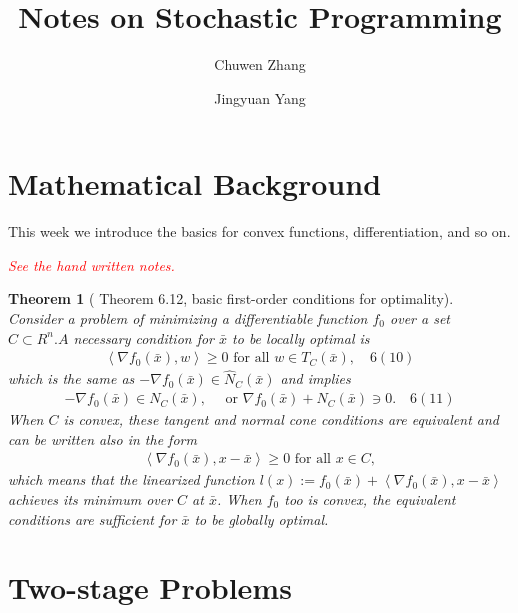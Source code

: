 \documentclass{beamerswitch}
\title{Notes on Stochastic Programming}
\newtheorem{thm}{Theorem}[section]
\begin{document}
\author[1]{\small Chuwen Zhang}
\author[1]{\small Jingyuan Yang}

\maketitle
\section{Mathematical Background}

This week we introduce the basics for convex functions, differentiation, and so on.

\emph{\textcolor{red}{See the hand written notes.}}

\begin{thm}[\cite{rockafellar_variational_2009} Theorem 6.12, basic first-order conditions for optimality] Consider a problem of minimizing a differentiable function \(f_{0}\) over a set \(C \subset R ^{n} . A\) necessary condition for \(\bar{x}\) to be locally optimal is
    \begin{align*}
        \left\langle\nabla f_{0}(\bar{x}), w\right\rangle \geq 0 \text { for all } w \in T_{C}(\bar{x}), \quad 6(10)
    \end{align*}
    which is the same as \(-\nabla f_{0}(\bar{x}) \in \widehat{N}_{C}(\bar{x})\) and implies
    \begin{align*}
        -\nabla f_{0}(\bar{x}) \in N_{C}(\bar{x}), \quad \text { or } \nabla f_{0}(\bar{x})+N_{C}(\bar{x}) \ni 0 . \quad 6(11)
    \end{align*}
    When \(C\) is convex, these tangent and normal cone conditions are equivalent and can be written also in the form
    \begin{align*}
        \left\langle\nabla f_{0}(\bar{x}), x-\bar{x}\right\rangle \geq 0 \text { for all } x \in C,
    \end{align*}
    which means that the linearized function \(l(x):=f_{0}(\bar{x})+\left\langle\nabla f_{0}(\bar{x}), x-\bar{x}\right\rangle\) achieves its minimum over \(C\) at \(\bar{x}\). When \(f_{0}\) too is convex, the equivalent conditions are sufficient for \(\bar{x}\) to be globally optimal.
\end{thm}

\section{Two-stage Problems}
\end{document}

